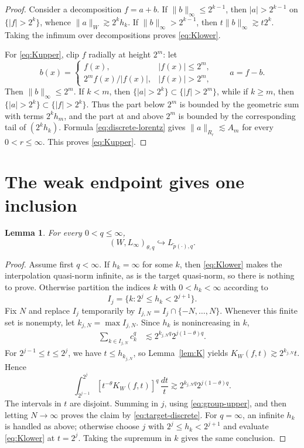 \documentclass[11pt]{article}
\newtheorem{lemma}[theorem]{Lemma}
\newcommand{\1}{\mathbf 1}
\begin{document}
\begin{proof}
Consider a decomposition $f=a+b$. If $\|b\|_\infty\leq2^{k-1}$, then
$|a|>2^{k-1}$ on $\{|f|>2^k\}$, whence
$\|a\|_W\gtrsim2^kh_k$. If $\|b\|_\infty>2^{k-1}$, then
$t\|b\|_\infty\gtrsim t2^k$. Taking the infimum over decompositions proves
\eqref{eq:Klower}.

For \eqref{eq:Kupper}, clip $f$ radially at height $2^m$: let
\[
 b(x)=\begin{cases}
 f(x),&|f(x)|\leq2^m,\\
 2^m f(x)/|f(x)|,&|f(x)|>2^m,
 \end{cases}
 \qquad a=f-b.
\]
Then $\|b\|_\infty\leq2^m$.  If $k<m$, then
$\{|a|>2^k\}\subset\{|f|>2^m\}$, while if $k\geq m$, then
$\{|a|>2^k\}\subset\{|f|>2^k\}$.  Thus the part below $2^m$ is bounded by
the geometric sum with terms $2^kh_m$, and the part at and above $2^m$ is
bounded by the corresponding tail of $(2^kh_k)$.  Formula
\eqref{eq:discrete-lorentz} gives $\|a\|_{R_r}\lesssim A_m$ for every
$0<r\leq\infty$. This proves \eqref{eq:Kupper}.
\end{proof}

\section{The weak endpoint gives one inclusion}

\begin{lemma}\label{lem:weak}
For every $0<q\leq\infty$,
\[
 (W,L_\infty)_{\theta,q}\hookrightarrow
 L_{\widetilde p(\cdot),q}.
\]
\end{lemma}

\begin{proof}
Assume first $q<\infty$.  If $h_k=\infty$ for some $k$, then
\eqref{eq:Klower} makes the interpolation quasi-norm infinite, as is the
target quasi-norm, so there is nothing to prove.  Otherwise partition the
indices $k$ with $0<h_k<\infty$ according to
\[
 I_j=\{k:2^j\leq h_k<2^{j+1}\}.
\]
Fix $N$ and replace $I_j$ temporarily by
$I_{j,N}=I_j\cap\{-N,\ldots,N\}$.  Whenever this finite set is nonempty,
let $k_{j,N}=\max I_{j,N}$. Since $h_k$ is nonincreasing in $k$,
\begin{align}\label{eq:group-upper}
 \sum_{k\in I_{j,N}}c_k^q
 &\lesssim 2^{k_{j,N}q}2^{j(1-\theta)q}.
\end{align}
For $2^{j-1}\leq t\leq2^j$, we have $t\leq h_{k_{j,N}}$, so
Lemma~\ref{lem:K} yields $K_W(f,t)\gtrsim2^{k_{j,N}}t$. Hence
\[
 \int_{2^{j-1}}^{2^j}
   [t^{-\theta}K_W(f,t)]^q\,\frac{dt}{t}
 \gtrsim 2^{k_{j,N}q}2^{j(1-\theta)q}.
\]
The intervals in $t$ are disjoint. Summing in $j$, using
\eqref{eq:group-upper}, and then letting $N\to\infty$ proves the claim by
\eqref{eq:target-discrete}.  For $q=\infty$, an infinite $h_k$ is handled
as above; otherwise choose $j$ with $2^j\leq h_k<2^{j+1}$ and evaluate
\eqref{eq:Klower} at $t=2^j$. Taking the supremum in $k$ gives the same
conclusion.
\end{proof}
\end{document}
